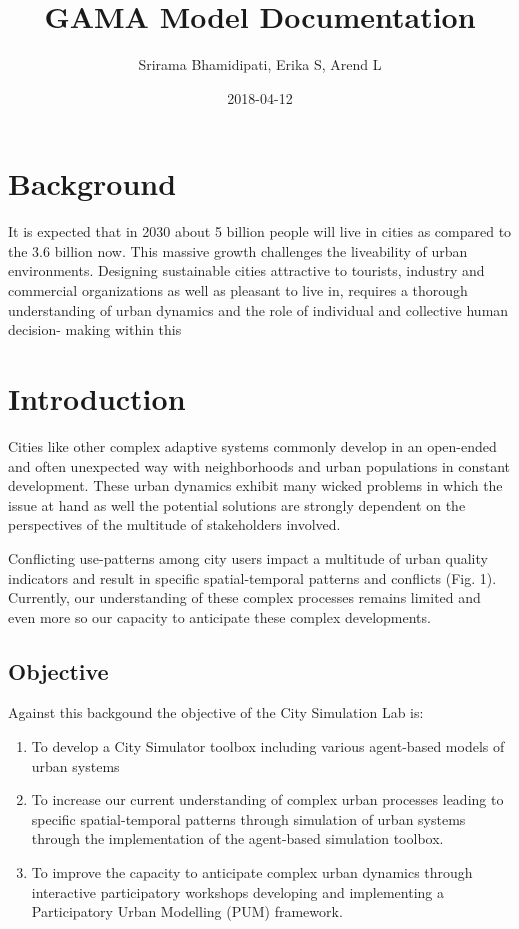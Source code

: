 \documentclass[]{book}
\title{GAMA Model Documentation}
\author{Srirama Bhamidipati, Erika S, Arend L}
\date{2018-04-12}
\providecommand{\tightlist}{%
  \setlength{\itemsep}{0pt}\setlength{\parskip}{0pt}}
\theoremstyle{definition}
\theoremstyle{definition}
\theoremstyle{definition}
\theoremstyle{remark}
\begin{document}
\maketitle

{
\setcounter{tocdepth}{1}
\tableofcontents
}
\hypertarget{background}{%
\chapter*{Background}\label{background}}

It is expected that in 2030 about 5 billion people will live in cities
as compared to the 3.6 billion now. This massive growth challenges the
liveability of urban environments. Designing sustainable cities
attractive to tourists, industry and commercial organizations as well as
pleasant to live in, requires a thorough understanding of urban dynamics
and the role of individual and collective human decision- making within
this

\hypertarget{introduction}{%
\chapter{Introduction}\label{introduction}}

Cities like other complex adaptive systems commonly develop in an
open-ended and often unexpected way with neighborhoods and urban
populations in constant development. These urban dynamics exhibit many
wicked problems in which the issue at hand as well the potential
solutions are strongly dependent on the perspectives of the multitude of
stakeholders involved.

Conflicting use-patterns among city users impact a multitude of urban
quality indicators and result in specific spatial-temporal patterns and
conflicts (Fig. 1). Currently, our understanding of these complex
processes remains limited and even more so our capacity to anticipate
these complex developments.

\hypertarget{objective}{%
\section{Objective}\label{objective}}

Against this backgound the objective of the City Simulation Lab is:

\begin{enumerate}
\def\labelenumi{\arabic{enumi})}
\tightlist
\item
  To develop a City Simulator toolbox including various agent-based
  models of urban systems
\item
  To increase our current understanding of complex urban processes
  leading to specific spatial-temporal patterns through simulation of
  urban systems through the implementation of the agent-based simulation
  toolbox.
\item
  To improve the capacity to anticipate complex urban dynamics through
  interactive participatory workshops developing and implementing a
  Participatory Urban Modelling (PUM) framework.
\end{enumerate}
\end{document}
